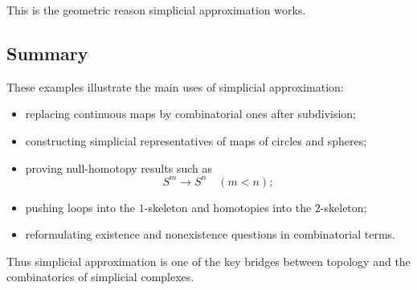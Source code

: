 \documentclass[12pt,a4paper]{article}
\theoremstyle{notespace}
\begin{document}
This is the geometric reason simplicial approximation works.

\subsection{Summary}

These examples illustrate the main uses of simplicial approximation:

\begin{itemize}
	\item replacing continuous maps by combinatorial ones after subdivision;
	\item constructing simplicial representatives of maps of circles and spheres;
	\item proving null-homotopy results such as
	\[
	S^m\to S^n \quad (m<n);
	\]
	\item pushing loops into the \(1\)-skeleton and homotopies into the \(2\)-skeleton;
	\item reformulating existence and nonexistence questions in combinatorial terms.
\end{itemize}

Thus simplicial approximation is one of the key bridges between topology and the combinatorics of simplicial complexes.
\end{document}
